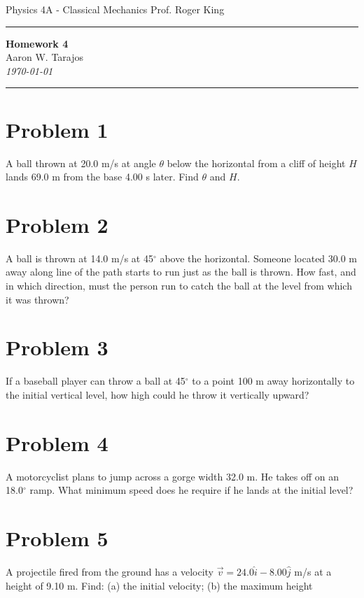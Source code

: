 \documentclass{article}
\begin{document}
\noindent
Physics 4A - Classical Mechanics \hfill Prof. Roger King

\noindent\rule{\textwidth}{0.4pt}

\begin{center}
    \textbf{\LARGE Homework 4} \\
    \vspace{12pt}
    \large Aaron W. Tarajos \\
    \textit{\today}
\end{center}

\noindent\rule{\textwidth}{0.4pt}

\section*{Problem 1}
A ball thrown at 20.0 m/s at angle $\theta$ below the horizontal from a cliff of height $H$ lands 69.0 m from the base 4.00 s later. Find $\theta$ and $H$.

\section*{Problem 2}
A ball is thrown at 14.0 m/s at 45$^\circ$ above the horizontal. Someone located 30.0 m away along line of the path starts to run just as the ball is thrown. How fast, and in which direction, must the person run to catch the ball at the level from which it was thrown?

\section*{Problem 3}
If a baseball player can throw a ball at 45$^\circ$ to a point 100 m away horizontally to the initial
vertical level, how high could he throw it vertically upward?

\section*{Problem 4}
A motorcyclist plans to jump across a gorge width 32.0 m. He takes off on an 18.0$^\circ$ ramp.
What minimum speed does he require if he lands at the initial level?


\section*{Problem 5}
A projectile fired from the ground has a velocity $\vec{v} = 24.0 \hat i - 8.00 \hat j$ m/s at a height of
9.10 m. Find: (a) the initial velocity; (b) the maximum height
\end{document}
